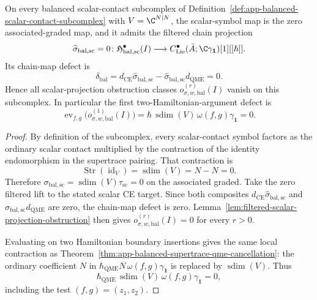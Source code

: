 \begin{prop}
\label{prop:app-balanced-scalar-contact-projection}
  On every balanced scalar-contact subcomplex of
  Definition~\ref{def:app-balanced-scalar-contact-subcomplex} with
  \(V=\C^{N|N}\), the scalar-symbol map is the zero associated-graded map,
  and it admits the filtered chain projection
  \[
    \widehat\sigma_{\mathrm{bal,sc}}=0\colon
    \mathfrak H^\bullet_{\mathrm{bal,sc}}(I)
      \longrightarrow
    C^\bullet_{\mathrm{Lie}}(\bar A;\C\gamma_{\mathbf 1})[1][[\hbar]] .
  \]
  Its chain-map defect is
  \[
    \delta_{\mathrm{bal}}
      =
    d_{\mathrm{CE}}\widehat\sigma_{\mathrm{bal,sc}}
      -\widehat\sigma_{\mathrm{bal,sc}}d_{\mathrm{QME}}
      =0.
  \]
  Hence all scalar-projection obstruction classes
  \(o^{(r)}_{\sigma,w,\mathrm{bal}}(I)\) vanish on this subcomplex.  In
  particular the first two-Hamiltonian-argument defect is
  \[
    \operatorname{ev}_{f,g}
      \bigl(o^{(1)}_{\sigma,w,\mathrm{bal}}(I)\bigr)
      =
    \hbar\,\operatorname{sdim}(V)\,
    \omega(f,g)\gamma_{\mathbf 1}
      =0 .
  \]
\end{prop}

\begin{proof}
  By definition of the subcomplex, every scalar-contact symbol factors as
  the ordinary scalar contact multiplied by the contraction of the
  identity endomorphism in the supertrace pairing.  That contraction is
  \[
    \operatorname{Str}(\operatorname{id}_V)
      =
    \operatorname{sdim}(V)=N-N=0 .
  \]
  Therefore
  \(\sigma_{\mathrm{bal,sc}}
    =\operatorname{sdim}(V)\tau_{\mathrm{sc}}=0\) on the associated
  graded.  Take the zero filtered lift to the stated scalar CE target.  Since both composites
  \(d_{\mathrm{CE}}\widehat\sigma_{\mathrm{bal,sc}}\) and
  \(\widehat\sigma_{\mathrm{bal,sc}}d_{\mathrm{QME}}\) are zero, the
  chain-map defect is zero.  Lemma~\ref{lem:filtered-scalar-projection-obstruction}
  then gives \(o^{(r)}_{\sigma,w,\mathrm{bal}}(I)=0\) for every
  \(r>0\).

  Evaluating on two Hamiltonian boundary insertions gives the same local
  contraction as Theorem~\ref{thm:app-balanced-supertrace-qme-cancellation}:
  the ordinary coefficient \(N\) in
  \(\hbar_{\mathrm{QME}}N\,\omega(f,g)\gamma_{\mathbf 1}\) is replaced by
  \(\operatorname{sdim}(V)\).  Thus
  \[
    \hbar_{\mathrm{QME}}\,\operatorname{sdim}(V)\,
    \omega(f,g)\gamma_{\mathbf 1}=0,
  \]
  including the test \((f,g)=(z_1,z_2)\).
\end{proof}

